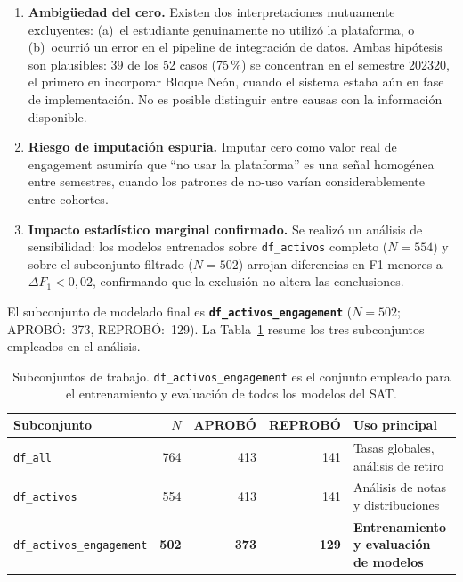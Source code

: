 \begin{enumerate}
  \item \textbf{Ambigüedad del cero.}
    Existen dos interpretaciones mutuamente excluyentes:
    (a)~el estudiante genuinamente no utilizó la plataforma,
    o (b)~ocurrió un error en el pipeline de integración de
    datos. Ambas hipótesis son plausibles: 39 de los 52 casos
    (75\,\%) se concentran en el semestre 202320, el primero
    en incorporar Bloque Neón, cuando el sistema estaba aún
    en fase de implementación. No es posible distinguir entre
    causas con la información disponible.

  \item \textbf{Riesgo de imputación espuria.}
    Imputar cero como valor real de engagement asumiría que
    ``no usar la plataforma'' es una señal homogénea entre
    semestres, cuando los patrones de no-uso varían
    considerablemente entre cohortes.

  \item \textbf{Impacto estadístico marginal confirmado.}
    Se realizó un análisis de sensibilidad: los modelos
    entrenados sobre \texttt{df\_activos} completo ($N = 554$)
    y sobre el subconjunto filtrado ($N = 502$) arrojan
    diferencias en F1 menores a $\Delta F_1 < 0{,}02$,
    confirmando que la exclusión no altera las conclusiones.
\end{enumerate}

El subconjunto de modelado final es
\textbf{\texttt{df\_activos\_engagement}}
($N = 502$; APROBÓ:~373, REPROBÓ:~129).
La Tabla~\ref{tab:subsets} resume los tres subconjuntos
empleados en el análisis.

\begin{table}[htbp]
  \centering
  \caption{Subconjuntos de trabajo. \texttt{df\_activos\_engagement}
           es el conjunto empleado para el entrenamiento y
           evaluación de todos los modelos del SAT.}
  \label{tab:subsets}
  \begin{tabular}{lrrrl}
    \toprule
    \textbf{Subconjunto} & \textbf{$N$}
      & \textbf{APROBÓ} & \textbf{REPROBÓ}
      & \textbf{Uso principal} \\
    \midrule
    \texttt{df\_all}
      & 764 & 413 & 141
      & Tasas globales, análisis de retiro \\
    \texttt{df\_activos}
      & 554 & 413 & 141
      & Análisis de notas y distribuciones \\
    \texttt{df\_activos\_engagement}
      & \textbf{502} & \textbf{373} & \textbf{129}
      & \textbf{Entrenamiento y evaluación de modelos} \\
    \bottomrule
  \end{tabular}
\end{table}

